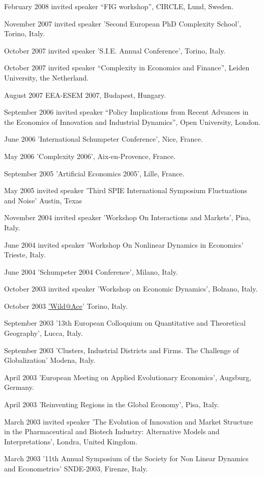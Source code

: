 \documentclass[a4paper]{article}
\begin{document}
February 2008 invited speaker ``FIG workshop'', CIRCLE, Lund, Sweden.

November 2007 invited speaker 'Second European PhD Complexity School',
Torino, Italy.

October 2007 invited speaker 'S.I.E. Annual Conference', Torino,
Italy.

October 2007 invited speaker ``Complexity in Economics and Finance'',
Leiden University, the Netherland.

August 2007  EEA-ESEM 2007, Budapest, Hungary.

September 2006 invited speaker ``Policy Implications from Recent
Advances in the Economics of Innovation and Industrial Dynamics'', Open
University, London.

June 2006 'International Schumpeter Conference', Nice, France.

May 2006 'Complexity 2006', Aix-en-Provence, France.

September 2005 'Artificial Economics 2005', Lille, France.

May 2005 invited speaker 'Third SPIE International Symposium
Fluctuations and Noise' Austin, Texas

November 2004 invited speaker 'Workshop On Interactions and
Markets', Pisa, Italy.

June 2004 invited speaker 'Workshop On Nonlinear Dynamics in
Economics' Trieste, Italy.

June 2004 'Schumpeter 2004 Conference', Milano, Italy.

October 2003 invited speaker 'Workshop on Economic Dynamics',
Bolzano, Italy.

October 2003 \href{mailto:'Wild@Ace}{'Wild@Ace}' Torino, Italy.

September 2003 '13th European Colloquium on Quantitative and
Theoretical Geography', Lucca, Italy.

September 2003 'Clusters, Industrial Districts and Firms. The
Challenge of Globalization' Modena, Italy.

April 2003 'European Meeting on Applied Evolutionary Economics',
Augsburg, Germany.

April 2003 'Reinventing Regions in the Global Economy', Pisa, Italy.

March 2003 invited speaker 'The Evolution of Innovation and Market
Structure in the Pharmaceutical and Biotech Industry: Alternative
Models and Interpretations', Londra, United Kingdom.

March 2003 '11th Annual Symposium of the Society for Non Linear
Dynamics and Econometrics' SNDE-2003, Firenze, Italy.
\end{document}
